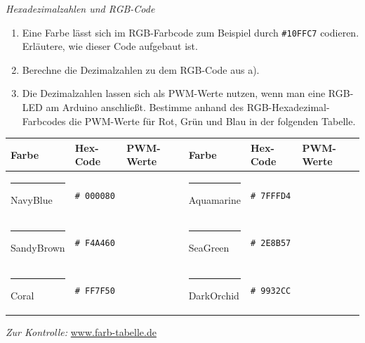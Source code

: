 \begin{aufgabe} \emph{Hexadezimalzahlen und RGB-Code}
	
	\begin{enumerate}[label=\alph*), itemsep=0mm,parsep=0mm]
		\item Eine Farbe lässt sich im RGB-Farbcode zum Beispiel durch \texttt{\#10FFC7} codieren. Erläutere, wie dieser Code aufgebaut ist.
		\item Berechne die Dezimalzahlen zu dem RGB-Code aus a).
		\item Die Dezimalzahlen lassen sich als PWM-Werte nutzen, wenn man eine RGB-LED am Arduino anschließt. Bestimme anhand des RGB-Hexadezimal-Farbcodes die PWM-Werte für Rot, Grün und Blau in der folgenden Tabelle.
	\end{enumerate}
	\vspace{-\baselineskip}
	\begin{table}[H]
		\centering
		\begin{minipage}[c]{\textwidth}
			\begin{tabu} to \textwidth {X[L,2]X[L]X[L]|X[L,2]X[L]X[L]}
				\toprule
				\textbf{Farbe} & \textbf{Hex-Code} & \textbf{PWM-Werte} & \textbf{Farbe} & \textbf{Hex-Code} & \textbf{PWM-Werte} \\
				\midrule
				\textcolor{navyblue}{\rule{1cm}{0.4cm}} NavyBlue	& \texttt{\# 000080} &  & \textcolor{aquamarine}{\rule{1cm}{0.4cm}} Aquamarine & \texttt{\# 7FFFD4} &  \\ 
				\textcolor{sandybrown}{\rule{1cm}{0.4cm}} SandyBrown	& \texttt{\# F4A460} &  & \textcolor{seagreen}{\rule{1cm}{0.4cm}} SeaGreen & \texttt{\# 2E8B57} &  \\
				\textcolor{coral}{\rule{1cm}{0.4cm}} Coral	& \texttt{\# FF7F50} &  & \textcolor{darkorchid}{\rule{1cm}{0.4cm}} DarkOrchid & \texttt{\# 9932CC} &  \\
				\bottomrule
			\end{tabu}
		\end{minipage}
		\label{tab:rgb-codes2}
	\end{table}
	\emph{Zur Kontrolle:} \href{http://www.farb-tabelle.de/de/rgb2hex.htm}{www.farb-tabelle.de}
\end{aufgabe}


